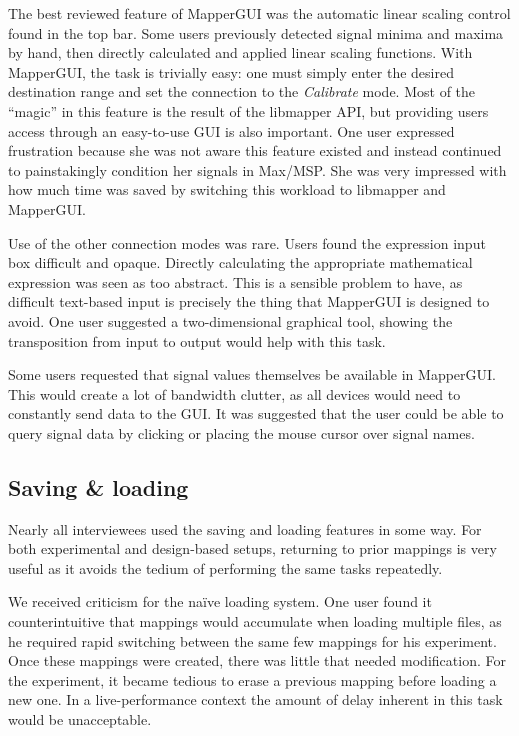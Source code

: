 The best reviewed feature of MapperGUI was the automatic linear scaling control found in the top bar. Some users previously detected signal minima and maxima by hand, then directly calculated and applied linear scaling functions. With MapperGUI, the task is trivially easy: one must simply enter the desired destination range and set the connection to the \emph{Calibrate} mode. Most of the ``magic'' in this feature is the result of the libmapper API, but providing users access through an easy-to-use GUI is also important. One user expressed frustration because she was not aware this feature existed and instead continued to painstakingly condition her signals in Max/MSP. She was very impressed with how much time was saved by switching this workload to libmapper and MapperGUI.

Use of the other connection modes was rare. Users found the expression input box difficult and opaque. Directly calculating the appropriate mathematical expression was seen as too abstract. This is a sensible problem to have, as difficult text-based input is precisely the thing that MapperGUI is designed to avoid. One user suggested a two-dimensional graphical tool, showing the transposition from input to output would help with this task. 

Some users requested that signal values themselves be available in MapperGUI. This would create a lot of bandwidth clutter, as all devices would need to constantly send data to the GUI. It was suggested that the user could be able to query signal data by clicking or placing the mouse cursor over signal names.
	

	\subsection{Saving \& loading} %
	\label{sub:saving_and_loading}

Nearly all interviewees used the saving and loading features in some way. For both experimental and design-based setups, returning to prior mappings is very useful as it avoids the tedium of performing the same tasks repeatedly.

We received criticism for the na\"ive loading system. One user found it counterintuitive that mappings would accumulate when loading multiple files, as he required rapid switching between the same few mappings for his experiment. Once these mappings were created, there was little that needed modification. For the experiment, it became tedious to erase a previous mapping before loading a new one. In a live-performance context the amount of delay inherent in this task would be unacceptable. 

